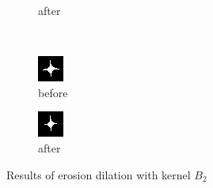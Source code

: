 \documentclass[12pt]{article}
\renewcommand{\subfiguresize}{.25\textwidth}
\begin{document}
\begin{figure}[H]
\begin{subfigure}[t]{\subfiguresize}
        \caption{after}
    \end{subfigure}\\[1em]
    \begin{subfigure}[t]{\subfiguresize}\centering
        \includegraphics[width=\textwidth]{img/image2.png}
        \caption{before}
    \end{subfigure}
    \hspace{2em}
    \begin{subfigure}[t]{\subfiguresize}\centering
        \includegraphics[width=\textwidth]{img/image2-erosion-b2.png}
        \caption{after}
    \end{subfigure}
    \caption{Results of erosion dilation with kernel $B_2$}
\end{figure} 
\end{document}
